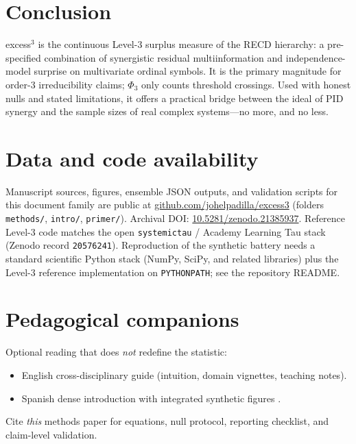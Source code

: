 \documentclass[11pt,a4paper]{article}
\newcommand{\ExcessThreeRepo}{https://github.com/johelpadilla/excess3}
\newcommand{\ExcessThreeRepoShort}{github.com/johelpadilla/excess3}
\newcommand{\ExcessThreeDOI}{10.5281/zenodo.21385937}
\newcommand{\ExcessThreeDOIURL}{https://doi.org/10.5281/zenodo.21385937}
\begin{document}
\section{Conclusion}
\label{sec:conclusion}

excess$^3$ is the continuous Level-3 surplus measure of the RECD hierarchy:
a pre-specified combination of synergistic residual multiinformation and
independence-model surprise on multivariate ordinal symbols. It is the
primary magnitude for order-3 irreducibility claims; $\Phi_3$ only counts
threshold crossings. Used with honest nulls and stated limitations, it
offers a practical bridge between the ideal of PID synergy and the sample
sizes of real complex systems---no more, and no less.

\section*{Data and code availability}

\begin{sloppypar}
Manuscript sources, figures, ensemble JSON outputs, and validation scripts
for this document family are public at
\href{\ExcessThreeRepo}{\ExcessThreeRepoShort}
(folders \texttt{methods/}, \texttt{intro/}, \texttt{primer/}).
Archival DOI: \href{\ExcessThreeDOIURL}{\ExcessThreeDOI}.
Reference Level-3 code matches the open \texttt{systemictau} /
Academy Learning Tau stack \citep{Padilla2026software}
(Zenodo record \texttt{20576241}).
Reproduction of the synthetic battery needs a standard scientific Python
stack (NumPy, SciPy, and related libraries) plus the Level-3 reference
implementation on \texttt{PYTHONPATH}; see the repository README.
\end{sloppypar}

\section*{Pedagogical companions}

Optional reading that does \emph{not} redefine the statistic:
\begin{itemize}[leftmargin=*,itemsep=2pt]
  \item English cross-disciplinary guide \citep{Padilla2026primer}
  (intuition, domain vignettes, teaching notes).
  \item Spanish dense introduction with integrated synthetic figures
  \citep{Padilla2026intro}.
\end{itemize}
Cite \emph{this} methods paper for equations, null protocol, reporting
checklist, and claim-level validation.
\end{document}
